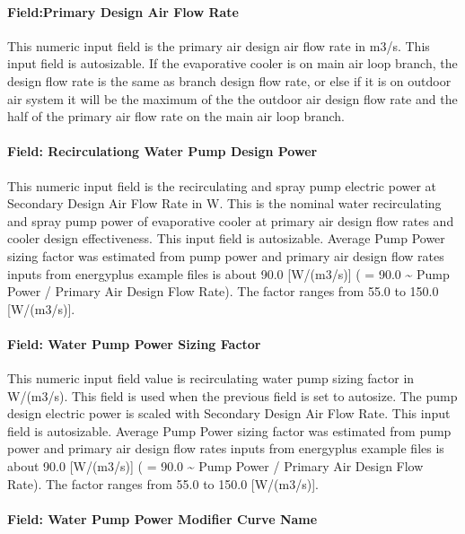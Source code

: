 \paragraph{Field:Primary Design Air Flow Rate}\label{fieldprimary-design-air-flow-rate}

This numeric input field is the primary air design air flow rate in m3/s. This input field is autosizable. If the evaporative cooler is on main air loop branch, the design flow rate is the same as branch design flow rate, or else if it is on outdoor air system it will be the maximum of the the outdoor air design flow rate and the half of the primary air flow rate on the main air loop branch.

\paragraph{Field: Recirculationg Water Pump Design Power}\label{field-recirculationg-water-pump-design-power}

This numeric input field is the recirculating and spray pump electric power at Secondary Design Air Flow Rate in W. This is the nominal water recirculating and spray pump power of evaporative cooler at primary air design flow rates and cooler design effectiveness. This input field is autosizable. Average Pump Power sizing factor was estimated from pump power and primary air design flow rates inputs from energyplus example files is about 90.0 {[}W/(m3/s){]} ( = 90.0 \textasciitilde{} Pump Power / Primary Air Design Flow Rate). The factor ranges from 55.0 to 150.0 {[}W/(m3/s){]}.

\paragraph{Field: Water Pump Power Sizing Factor}\label{field-water-pump-power-sizing-factor}

This numeric input field value is recirculating water pump sizing factor in W/(m3/s). This field is used when the previous field is set to autosize. The pump design electric power is scaled with Secondary Design Air Flow Rate. This input field is autosizable. Average Pump Power sizing factor was estimated from pump power and primary air design flow rates inputs from energyplus example files is about 90.0 {[}W/(m3/s){]} ( = 90.0 \textasciitilde{} Pump Power / Primary Air Design Flow Rate). The factor ranges from 55.0 to 150.0 {[}W/(m3/s){]}.

\paragraph{Field: Water Pump Power Modifier Curve Name}\label{field-water-pump-power-modifier-curve-name}

